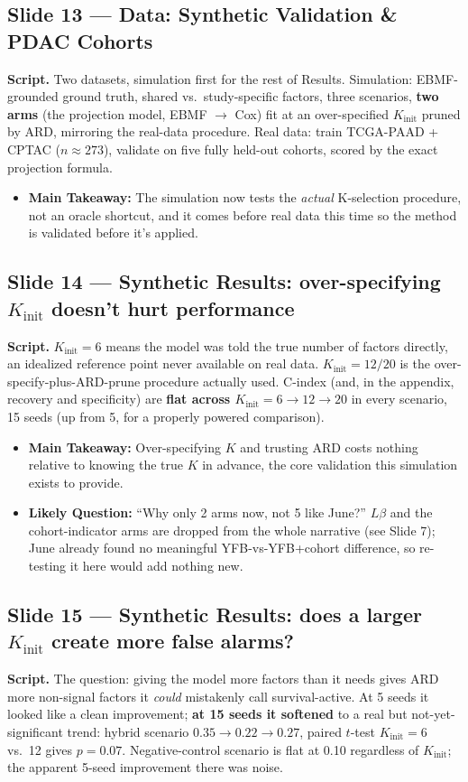 \documentclass[11pt]{article}
\newcommand{\scriptlabel}{\textbf{Script. }}
\newcommand{\sectionlabel}[1]{\textbf{#1}}
\newcommand{\key}[1]{\textcolor{keyblue}{\textbf{#1}}}        %
\begin{document}
\subsection*{Slide 13 --- Data: Synthetic Validation \& PDAC Cohorts}
\scriptlabel Two datasets, simulation first for the rest of Results. Simulation: EBMF-grounded ground
truth, shared vs.\ study-specific factors, three scenarios, \key{two arms} (the projection model,
EBMF $\to$ Cox) fit at an over-specified $K_\text{init}$ pruned by ARD, mirroring the real-data
procedure. Real data: train TCGA-PAAD + CPTAC ($n\approx273$), validate on five fully held-out
cohorts, scored by the exact projection formula.

\begin{itemize}
\item \sectionlabel{Main Takeaway:} The simulation now tests the \emph{actual} K-selection procedure,
not an oracle shortcut, and it comes before real data this time so the method is validated before
it's applied.
\end{itemize}

\subsection*{Slide 14 --- Synthetic Results: over-specifying $K_\text{init}$ doesn't hurt performance}
\scriptlabel \key{$K_\text{init}=6$} means the model was told the true number of factors directly, an
idealized reference point never available on real data. \key{$K_\text{init}=12/20$} is the
over-specify-plus-ARD-prune procedure actually used. C-index (and, in the appendix, recovery and
specificity) are \key{flat across $K_\text{init}=6\to12\to20$} in every scenario, 15 seeds (up from
5, for a properly powered comparison).

\begin{itemize}
\item \sectionlabel{Main Takeaway:} Over-specifying $K$ and trusting ARD costs nothing relative to
knowing the true $K$ in advance, the core validation this simulation exists to provide.
\item \sectionlabel{Likely Question:} ``Why only 2 arms now, not 5 like June?'' $L\beta$ and the
cohort-indicator arms are dropped from the whole narrative (see Slide 7); June already found no
meaningful YFB-vs-YFB+cohort difference, so re-testing it here would add nothing new.
\end{itemize}

\subsection*{Slide 15 --- Synthetic Results: does a larger $K_\text{init}$ create more false alarms?}
\scriptlabel The question: giving the model more factors than it needs gives ARD more non-signal
factors it \emph{could} mistakenly call survival-active. At 5 seeds it looked like a clean
improvement; \key{at 15 seeds it softened} to a real but not-yet-significant trend: hybrid scenario
$0.35\to0.22\to0.27$, paired $t$-test $K_\text{init}=6$ vs.\ 12 gives $p=0.07$. Negative-control
scenario is flat at 0.10 regardless of $K_\text{init}$; the apparent 5-seed improvement there was
noise.
\end{document}

